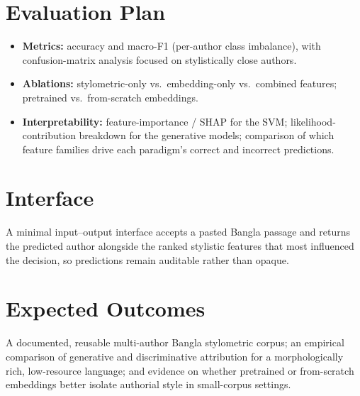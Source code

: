 \documentclass[11pt]{article}
\begin{document}
\section{Evaluation Plan}
\begin{itemize}
    \item \textbf{Metrics:} accuracy and macro-F1 (per-author class imbalance), with confusion-matrix analysis focused on stylistically close authors.
    \item \textbf{Ablations:} stylometric-only vs.\ embedding-only vs.\ combined features; pretrained vs.\ from-scratch embeddings.
    \item \textbf{Interpretability:} feature-importance / SHAP for the SVM; likelihood-contribution breakdown for the generative models; comparison of which feature families drive each paradigm's correct and incorrect predictions.
\end{itemize}

\section{Interface}
A minimal input--output interface accepts a pasted Bangla passage and returns the predicted author alongside the ranked stylistic features that most influenced the decision, so predictions remain auditable rather than opaque.

\section{Expected Outcomes}
A documented, reusable multi-author Bangla stylometric corpus; an empirical comparison of generative and discriminative attribution for a morphologically rich, low-resource language; and evidence on whether pretrained or from-scratch embeddings better isolate authorial style in small-corpus settings.
\end{document}

